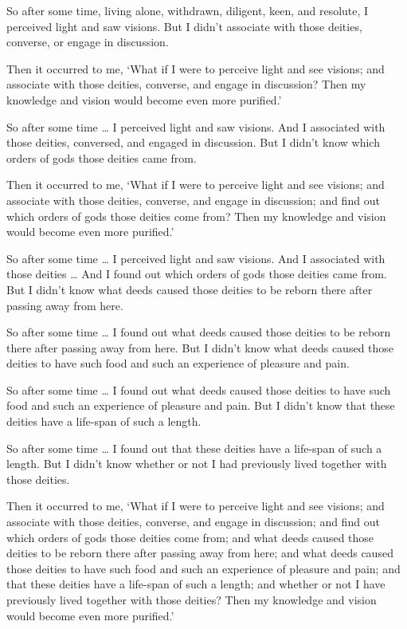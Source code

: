 \documentclass[12pt,openany]{book}%
\begin{document}
So after some time, living alone, withdrawn, diligent, keen, and resolute, I perceived light and saw visions. But I didn’t associate with those deities, converse, or engage in discussion. 

Then it occurred to me, ‘What if I were to perceive light and see visions; and associate with those deities, converse, and engage in discussion? Then my knowledge and vision would become even more purified.’ 

So after some time … I perceived light and saw visions. And I associated with those deities, conversed, and engaged in discussion. But I didn’t know which orders of gods those deities came from. 

Then it occurred to me, ‘What if I were to perceive light and see visions; and associate with those deities, converse, and engage in discussion; and find out which orders of gods those deities come from? Then my knowledge and vision would become even more purified.’ 

So after some time … I perceived light and saw visions. And I associated with those deities … And I found out which orders of gods those deities came from. But I didn’t know what deeds caused those deities to be reborn there after passing away from here. 

So after some time … I found out what deeds caused those deities to be reborn there after passing away from here. But I didn’t know what deeds caused those deities to have such food and such an experience of pleasure and pain. 

So after some time … I found out what deeds caused those deities to have such food and such an experience of pleasure and pain. But I didn’t know that these deities have a life-span of such a length. 

So after some time … I found out that these deities have a life-span of such a length. But I didn’t know whether or not I had previously lived together with those deities. 

Then it occurred to me, ‘What if I were to perceive light and see visions; and associate with those deities, converse, and engage in discussion; and find out which orders of gods those deities come from; and what deeds caused those deities to be reborn there after passing away from here; and what deeds caused those deities to have such food and such an experience of pleasure and pain; and that these deities have a life-span of such a length; and whether or not I have previously lived together with those deities? Then my knowledge and vision would become even more purified.’ 
\end{document}
